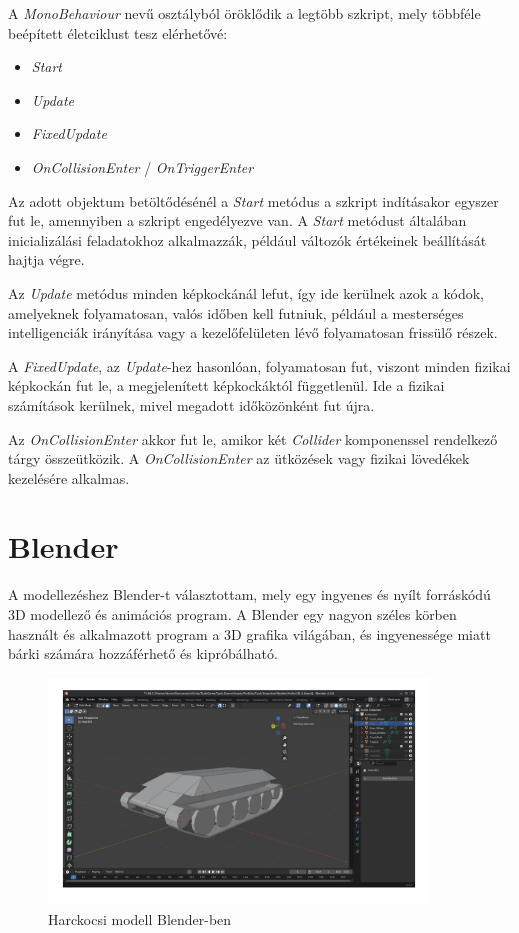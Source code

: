 \documentclass[
]{thesis-ekf}
\theoremstyle{definition}
\theoremstyle{remark}
\begin{document}
A \emph{MonoBehaviour} nevű osztályból öröklődik a legtöbb szkript, mely többféle beépített életciklust tesz elérhetővé:

\begin{itemize}
    \item \emph{Start}
    \item \emph{Update}
    \item \emph{FixedUpdate}
    \item \emph{OnCollisionEnter} / \emph{OnTriggerEnter}
\end{itemize}

Az adott objektum betöltődésénél a \emph{Start} metódus a szkript indításakor egyszer fut le, amennyiben a szkript engedélyezve van. A \emph{Start} metódust általában inicializálási feladatokhoz alkalmazzák, például változók értékeinek beállítását hajtja végre.

Az \emph{Update} metódus minden képkockánál lefut, így ide kerülnek azok a kódok, amelyeknek folyamatosan, valós időben kell futniuk, például a mesterséges intelligenciák irányítása vagy a kezelőfelületen lévő folyamatosan frissülő részek.

A \emph{FixedUpdate}, az \emph{Update}-hez hasonlóan, folyamatosan fut, viszont minden fizikai képkockán fut le, a megjelenített képkockáktól függetlenül. Ide a fizikai számítások kerülnek, mivel megadott időközönként fut újra.

Az \emph{OnCollisionEnter} akkor fut le, amikor két \emph{Collider} komponenssel rendelkező tárgy összeütközik. A \emph{OnCollisionEnter} az ütközések vagy fizikai lövedékek kezelésére alkalmas.


\section{Blender}

A modellezéshez Blender-t választottam, mely egy ingyenes és nyílt forráskódú 3D modellező és animációs program. A Blender egy nagyon széles körben használt és alkalmazott program a 3D grafika világában, és ingyenessége miatt bárki számára   hozzáférhető és kipróbálható.

\begin{figure}[H]
    \centering
    \includegraphics[width=0.9\textwidth]{screenshots/blender.png}
    \caption{Harckocsi modell Blender-ben}
    \label{fig:blender}
\end{figure}
\end{document}
